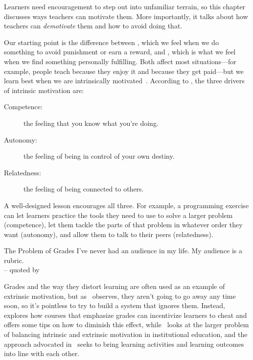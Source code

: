 
Learners need encouragement to step out into unfamiliar terrain,
so this chapter discusses ways teachers can motivate them.
More importantly,
it talks about how teachers can \emph{demotivate} them
and how to avoid doing that.

Our starting point is the difference between
,
which we feel when we do something to avoid punishment or earn a reward,
and ,
which is what we feel when we find something personally fulfilling.
Both affect most situations---for example,
people teach because they enjoy it and because they get paid---but
we learn best when we are intrinsically motivated~\cite{Wlod2017}.
According to ,
the three drivers of intrinsic motivation are:

\begin{description}

\item[Competence:]
  the feeling that you know what you're doing.

\item[Autonomy:]
  the feeling of being in control of your own destiny.

\item[Relatedness:]
  the feeling of being connected to others.

\end{description}

A well-designed lesson encourages all three.
For example,
a programming exercise can
let learners practice the tools they need to use to solve a larger problem (competence),
let them tackle the parts of that problem in whatever order they want (autonomy),
and allow them to talk to their peers (relatedness).

\begin{aside}{The Problem of Grades}
  I've never had an audience in my life. My audience is a rubric.\\
  -- quoted by 

  Grades and the way they distort learning are often used as an example of extrinsic motivation,
  but as~\cite{Mill2016a} observes,
  they aren't going to go away any time soon,
  so it's pointless to try to build a system that ignores them.
  Instead,~\cite{Lang2013} explores how courses that emphasize grades
  can incentivize learners to cheat
  and offers some tips on how to diminish this effect,
  while~\cite{Covi2017} looks at the larger problem of
  balancing intrinsic and extrinsic motivation in institutional education,
  and the  approach
  advocated in~\cite{Bigg2011} seeks to bring learning activities and learning outcomes
  into line with each other.
\end{aside}

